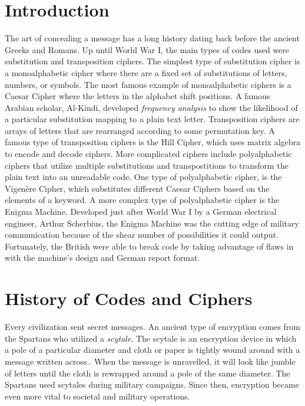 \documentclass[12pt,letterpaper]{article} %
\begin{document}
\section{Introduction}
The art of concealing a message has a long history dating back before the ancient Greeks and Romans.  Up until World War I, the main types of codes used were substitution and transposition ciphers.  The simplest type of substitution cipher is a monoalphabetic cipher where there are a fixed set of substitutions of letters, numbers, or symbols.  The most famous example of monoalphabetic ciphers is a Caesar Cipher where the letters in the alphabet shift positions.  A famous Arabian scholar, Al-Kindi, developed \emph{frequency analysis} to show the likelihood of a particular substitution mapping to a plain text letter. Transposition ciphers are arrays of letters that are rearranged according to some permutation key.  A famous type of transposition ciphers is the Hill Cipher, which uses matrix algebra to encode and decode ciphers.  More complicated ciphers include polyalphabetic ciphers that utilize multiple substitutions and transpostitions to transform the plain text into an unreadable code. One type of polyalphabetic cipher, is the Vigen\`ere Cipher, which substitutes different Caesar Ciphers based on the elements of a keyword. A more complex type of polyalphabetic cipher is the Enigma Machine. Developed just after World War I by a German electrical engineer, Arthur Scherbius, the Enigma Machine was the cutting edge of military communication because of the shear number of possibilities it could output.  Fortunately, the British were able to break code by taking advantage of flaws in with the machine's design and German report format. 

\section{History of Codes and Ciphers}
Every civilization sent secret messages.  An ancient type of encryption comes from the Spartans who utilized a \emph{scytale}.  The scytale is an encryption device in which a pole of a particular diameter and cloth or paper is tightly wound around with a message written across.\cite{Zgraggen}. When the message is unravelled,  it will look like jumble of letters until the cloth is rewrapped around a pole of the same diameter. The Spartans used scytales during military campaigns\cite{Zgraggen}.  Since then, encryption became even more vital to societal and military operations.
\end{document}
